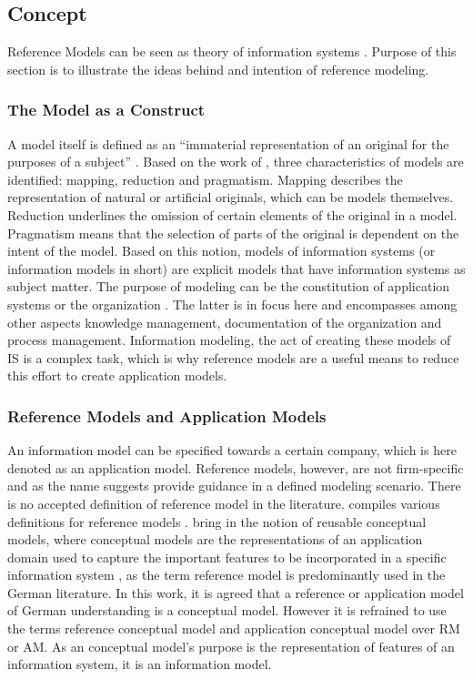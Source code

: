 		\subsection{Concept}
		
		Reference Models can be seen as theory of information systems \citep{Schutte1998}. Purpose of this section is to illustrate the ideas behind and intention of reference modeling.  
		
		\subsubsection{The Model as a Construct}
		
		
		A model itself is defined as an \enquote{immaterial representation of an original for the purposes of a subject} \citep[]{BeckerGOM2012}. Based on the work of \cite{Stachowiak1973}, three characteristics of models are identified: mapping, reduction and pragmatism. Mapping describes the representation of natural or artificial originals, which can be models themselves. Reduction underlines the omission of certain elements of the original in a model. Pragmatism means that the selection of parts of the original is dependent on the intent of the model. Based on this notion, models of information systems (or information models in short) are explicit models that have information systems as subject matter. The purpose of modeling can be the constitution of application systems or the organization \citep[]{Rosemann2012proc}. The latter is in focus here and encompasses among other aspects knowledge management, documentation of the organization and process management. Information modeling, the act of creating these models of \acrshort{IS} is a complex task, which is why reference models are a useful means to reduce this effort \citep{Becker2007} to create application models.
		 
			\subsubsection{Reference Models and Application Models}
			An information model can be specified towards a certain company, which is here denoted as an application model. Reference models, however, are not firm-specific and as the name suggests provide guidance in a defined modeling scenario. There is no accepted definition of reference model in the literature. \citeauthor{thomas2006a} compiles various definitions for reference models \citep{thomas2006a}. \citeauthor{vom2006reusable} bring in the notion of reusable conceptual models, where conceptual models are the representations of an application domain used to capture the important features to be incorporated in a specific information system \citep[]{vom2006reusable}, as the term reference model is predominantly used in the German literature. In this work, it is agreed that a reference or application model of German understanding is a conceptual model. However it is refrained to use the terms reference conceptual model and application conceptual model over \acrfull{RM} or \acrfull{AM}. As an conceptual model's purpose is the representation of features of an information system, it is an information model. 
			

